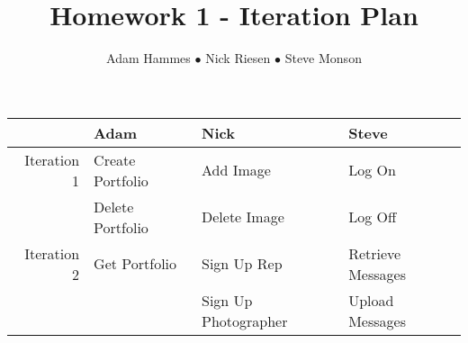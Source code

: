 \documentclass[12pt]{article}
\title{\vspace{.5in}Homework 1 - Iteration Plan}
\author{Adam Hammes $\bullet$ Nick Riesen $\bullet$ Steve Monson}
\begin{document}
\maketitle

\begin{center}
\begin{tabular}{| r | l | l | l |}
    \hline             & Adam             & Nick                 & Steve \\
    \hline Iteration 1 & Create Portfolio & Add Image            & Log On \\
                       & Delete Portfolio & Delete Image         & Log Off \\
    \hline Iteration 2 & Get Portfolio    & Sign Up Rep          & Retrieve Messages \\
                       &                  & Sign Up Photographer & Upload Messages \\
    \hline
\end{tabular}
\end{center}
\end{document}
